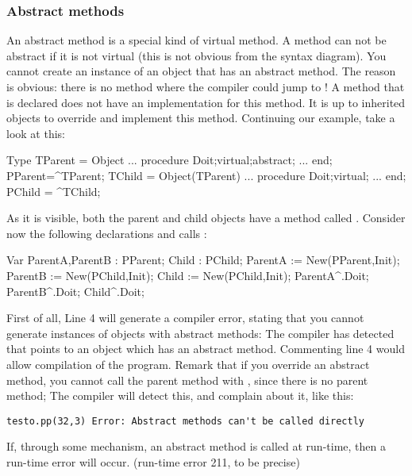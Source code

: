 \documentclass{report}
\begin{document}
\subsubsection{Abstract methods}
An abstract method is a special kind of virtual method. A method can not be
abstract if it is not virtual (this is not obvious from the syntax diagram). 
You cannot create an instance of an object that has an abstract method. 
The reason is obvious: there is no method where the compiler could jump to !
A method that is declared  does not have an implementation for
this method. It is up to inherited objects to override and implement this 
method. Continuing our example, take a look at this:
\begin{listing}
Type
  TParent = Object 
    ...
    procedure Doit;virtual;abstract;
    ...
    end;
  PParent=^TParent;
  TChild = Object(TParent) 
    ...
    procedure Doit;virtual;
    ...
    end;
  PChild = ^TChild;  
\end{listing}
As it is visible, both the parent and child objects have a method called
. Consider now the following declarations and calls :
\begin{listing}
Var ParentA,ParentB : PParent;
    Child           : PChild;
   ParentA := New(PParent,Init);
   ParentB := New(PChild,Init);
   Child := New(PChild,Init);
   ParentA^.Doit;
   ParentB^.Doit;
   Child^.Doit;
\end{listing}
First of all, Line 4 will generate a compiler error, stating that you cannot
generate instances of objects with abstract methods: The compiler has
detected that  points to an object which has an abstract
method. Commenting line 4 would allow compilation of the program.
Remark that if you override an abstract method, you cannot call the parent
method with , since there is no parent method; The compiler
will detect this, and complain about it, like this:
\begin{verbatim}
testo.pp(32,3) Error: Abstract methods can't be called directly
\end{verbatim}
If, through some mechanism, an abstract method is called at run-time,
then a run-time error will occur. (run-time error 211, to be precise)
\end{document}
